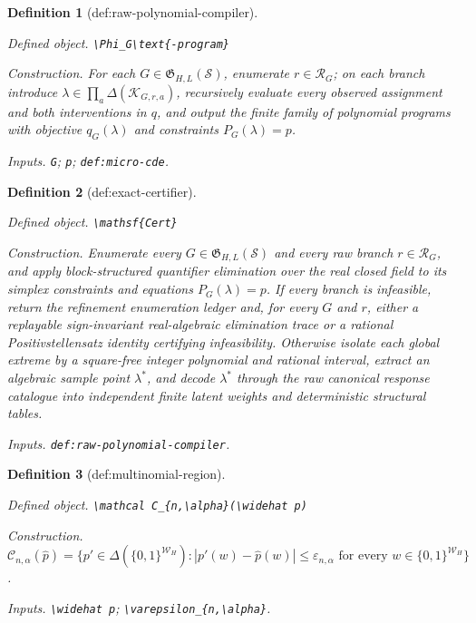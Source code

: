 \documentclass{article}
\newtheorem{definition}{Definition}
\begin{document}
\begin{definition}[def:raw-polynomial-compiler]\label{def:raw-polynomial-compiler}
\par\smallskip\noindent\emph{Defined object.} \texttt{\textbackslash{}\allowbreak{}Phi\_\allowbreak{}G\textbackslash{}\allowbreak{}text\{-\allowbreak{}program\}\allowbreak{}}
\par\smallskip\noindent\emph{Construction.} For each \(G\in\mathfrak G_{H,L}(\mathcal S)\), enumerate \(r\in\mathcal R_G\); on each branch introduce \(\lambda\in\prod_a\Delta(\mathcal K_{G,r,a})\), recursively evaluate every observed assignment and both interventions in \(q\), and output the finite family of polynomial programs with objective \(q_G(\lambda)\) and constraints \(P_G(\lambda)=p\).
\par\smallskip\noindent\emph{Inputs.} \texttt{G}; \texttt{p}; \texttt{def:\allowbreak{}micro-\allowbreak{}cde}.
\end{definition}

\begin{definition}[def:exact-certifier]\label{def:exact-certifier}
\par\smallskip\noindent\emph{Defined object.} \texttt{\textbackslash{}\allowbreak{}mathsf\{Cert\}\allowbreak{}}
\par\smallskip\noindent\emph{Construction.} Enumerate every \(G\in\mathfrak G_{H,L}(\mathcal S)\) and every raw branch \(r\in\mathcal R_G\), and apply block-structured quantifier elimination over the real closed field to its simplex constraints and equations \(P_G(\lambda)=p\). If every branch is infeasible, return the refinement enumeration ledger and, for every \(G\) and \(r\), either a replayable sign-invariant real-algebraic elimination trace or a rational Positivstellensatz identity certifying infeasibility. Otherwise isolate each global extreme by a square-free integer polynomial and rational interval, extract an algebraic sample point \(\lambda^*\), and decode \(\lambda^*\) through the raw canonical response catalogue into independent finite latent weights and deterministic structural tables.
\par\smallskip\noindent\emph{Inputs.} \texttt{def:\allowbreak{}raw-\allowbreak{}polynomial-\allowbreak{}compiler}.
\end{definition}

\begin{definition}[def:multinomial-region]\label{def:multinomial-region}
\par\smallskip\noindent\emph{Defined object.} \texttt{\textbackslash{}\allowbreak{}mathcal C\_\allowbreak{}\{n,\allowbreak{}\textbackslash{}\allowbreak{}alpha\}\allowbreak{}(\textbackslash{}\allowbreak{}widehat p)}
\par\smallskip\noindent\emph{Construction.} \(\mathcal C_{n,\alpha}(\widehat p)=\{p'\in\Delta(\{0,1\}^{\mathcal W_H}):|p'(w)-\widehat p(w)|\le\varepsilon_{n,\alpha}\text{ for every }w\in\{0,1\}^{\mathcal W_H}\}\).
\par\smallskip\noindent\emph{Inputs.} \texttt{\textbackslash{}\allowbreak{}widehat p}; \texttt{\textbackslash{}\allowbreak{}varepsilon\_\allowbreak{}\{n,\allowbreak{}\textbackslash{}\allowbreak{}alpha\}\allowbreak{}}.
\end{definition}
\end{document}
